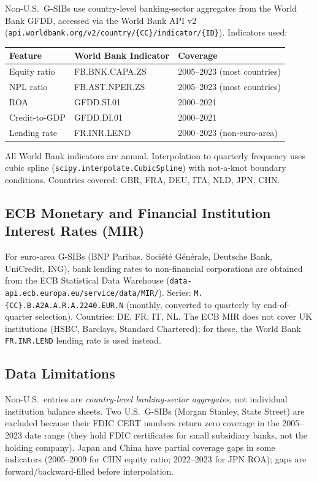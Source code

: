 \documentclass[11pt]{article}
\theoremstyle{definition}
\begin{document}
\begin{appendices}
Non-U.S.\ G-SIBs use country-level banking-sector aggregates from the
World Bank GFDD, accessed via the World Bank API v2
(\texttt{api.worldbank.org/v2/country/\{CC\}/indicator/\{ID\}}).
Indicators used:

\begin{center}
\begin{tabular}{lll}
\toprule
Feature & World Bank Indicator & Coverage \\
\midrule
Equity ratio    & FB.BNK.CAPA.ZS  & 2005--2023 (most countries) \\
NPL ratio       & FB.AST.NPER.ZS  & 2005--2023 (most countries) \\
ROA             & GFDD.SI.01      & 2000--2021 \\
Credit-to-GDP   & GFDD.DI.01      & 2000--2021 \\
Lending rate     & FR.INR.LEND     & 2000--2023 (non-euro-area) \\
\bottomrule
\end{tabular}
\end{center}

All World Bank indicators are annual.  Interpolation to quarterly frequency
uses cubic spline (\texttt{scipy.interpolate.CubicSpline}) with
not-a-knot boundary conditions.
Countries covered: GBR, FRA, DEU, ITA, NLD, JPN, CHN.

\subsection{ECB Monetary and Financial Institution Interest Rates (MIR)}

For euro-area G-SIBs (BNP Paribas, Soci\'et\'e G\'en\'erale, Deutsche Bank,
UniCredit, ING), bank lending rates to non-financial corporations are
obtained from the ECB Statistical Data Warehouse
(\texttt{data-api.ecb.europa.eu/service/data/MIR/}).
Series: \texttt{M.\{CC\}.B.A2A.A.R.A.2240.EUR.N} (monthly, converted to
quarterly by end-of-quarter selection).  Countries: DE, FR, IT, NL.
The ECB MIR does not cover UK institutions (HSBC, Barclays, Standard
Chartered); for these, the World Bank \texttt{FR.INR.LEND} lending rate
is used instead.

\subsection{Data Limitations}

Non-U.S.\ entries are \emph{country-level banking-sector aggregates},
not individual institution balance sheets.  Two U.S.\ G-SIBs (Morgan
Stanley, State Street) are excluded because their FDIC CERT numbers
return zero coverage in the 2005--2023 date range (they hold FDIC
certificates for small subsidiary banks, not the holding company).
Japan and China have partial coverage gaps in some indicators
(2005--2009 for CHN equity ratio; 2022--2023 for JPN ROA);
gaps are forward/backward-filled before interpolation.

\end{appendices}
\end{document}
